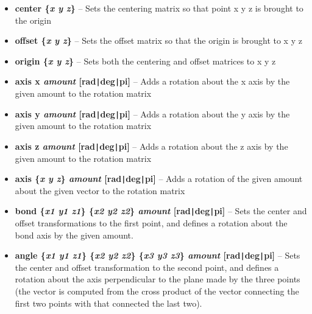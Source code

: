\newenvironment{MYitemize}{%
  \renewcommand{\labelitemi}{\bfseries --}%
      \begin{itemize}}{\end{itemize}}
\begin{MYitemize}
\item {\bf center \{{\it x y z}\}} --
	Sets the centering matrix so that point {x y z} is brought to the origin
\item {\bf offset \{{\it x y z}\}} --
	Sets the offset matrix so that the origin is brought to {x y z}
\item {\bf origin \{{\it x y z}\}} --
	Sets both the centering and offset matrices to {x y z}

\item {\bf axis x {\it amount} [rad\verb!|!deg\verb!|!pi]}
--
	Adds a rotation about the x axis by the given amount to the
rotation matrix

\item {\bf axis y {\it amount} [rad\verb!|!deg\verb!|!pi]}
--
	Adds a rotation about the y axis by the given amount to the
rotation matrix

\item {\bf axis z {\it amount} [rad\verb!|!deg\verb!|!pi]}
-- 
	Adds a rotation about the z axis by the given amount to the
rotation matrix

\item {\bf axis \{{\it x y z}\} {\it amount} [rad\verb!|!deg\verb!|!pi]} --
	Adds a rotation of the given amount about the given vector to
the rotation matrix

\item {\bf bond \{{\it x1 y1 z1}\} \{{\it x2 y2 z2}\} {\it amount} 
      [rad\verb!|!deg\verb!|!pi]} --
	Sets the center and offset transformations to the first point,
and defines a rotation about the bond axis by the given amount.

\item {\bf angle \{{\it x1 y1 z1}\} \{{\it x2 y2 z2}\} \{{\it x3 y3 z3}\} 
    {\it amount} [rad\verb!|!deg\verb!|!pi]} --
	Sets the center and offset transformation to the second point,
and defines a rotation about the axis perpendicular to the plane made
by the three points (the vector is computed from the cross product of
the vector connecting the first two points with that connected the
last two).
\end{MYitemize}

